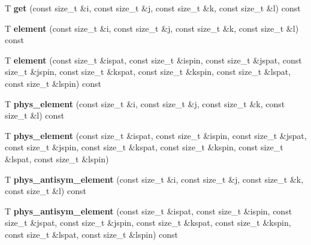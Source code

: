\begin{DoxyCompactItemize}
\item 
T {\bfseries get} (const size\+\_\+t \&i, const size\+\_\+t \&j, const size\+\_\+t \&k, const size\+\_\+t \&l) const \hypertarget{classIntegrals__2e_ae5b99d50f6287691a7277a6739e34870}{}\label{classIntegrals__2e_ae5b99d50f6287691a7277a6739e34870}

\item 
T {\bfseries element} (const size\+\_\+t \&i, const size\+\_\+t \&j, const size\+\_\+t \&k, const size\+\_\+t \&l) const \hypertarget{classIntegrals__2e_a5da037fab4adbcae7f8b0688db61015c}{}\label{classIntegrals__2e_a5da037fab4adbcae7f8b0688db61015c}

\item 
T {\bfseries element} (const size\+\_\+t \&ispat, const size\+\_\+t \&ispin, const size\+\_\+t \&jspat, const size\+\_\+t \&jspin, const size\+\_\+t \&kspat, const size\+\_\+t \&kspin, const size\+\_\+t \&lspat, const size\+\_\+t \&lspin) const \hypertarget{classIntegrals__2e_a252e644b5f183101942933b4510f5bfd}{}\label{classIntegrals__2e_a252e644b5f183101942933b4510f5bfd}

\item 
T {\bfseries phys\+\_\+element} (const size\+\_\+t \&i, const size\+\_\+t \&j, const size\+\_\+t \&k, const size\+\_\+t \&l) const \hypertarget{classIntegrals__2e_a64921e348860e7888cc1a09895c47c92}{}\label{classIntegrals__2e_a64921e348860e7888cc1a09895c47c92}

\item 
T {\bfseries phys\+\_\+element} (const size\+\_\+t \&ispat, const size\+\_\+t \&ispin, const size\+\_\+t \&jspat, const size\+\_\+t \&jspin, const size\+\_\+t \&kspat, const size\+\_\+t \&kspin, const size\+\_\+t \&lspat, const size\+\_\+t \&lspin)\hypertarget{classIntegrals__2e_a682cbd2ff57e84cf32b5b2af9fb7cf45}{}\label{classIntegrals__2e_a682cbd2ff57e84cf32b5b2af9fb7cf45}

\item 
T {\bfseries phys\+\_\+antisym\+\_\+element} (const size\+\_\+t \&i, const size\+\_\+t \&j, const size\+\_\+t \&k, const size\+\_\+t \&l) const \hypertarget{classIntegrals__2e_aa7fea1ef7267ff36439bf1cc7580eb0a}{}\label{classIntegrals__2e_aa7fea1ef7267ff36439bf1cc7580eb0a}

\item 
T {\bfseries phys\+\_\+antisym\+\_\+element} (const size\+\_\+t \&ispat, const size\+\_\+t \&ispin, const size\+\_\+t \&jspat, const size\+\_\+t \&jspin, const size\+\_\+t \&kspat, const size\+\_\+t \&kspin, const size\+\_\+t \&lspat, const size\+\_\+t \&lspin) const \hypertarget{classIntegrals__2e_a79cf3ad586d2626e3d3b3b3b86ce41f9}{}\label{classIntegrals__2e_a79cf3ad586d2626e3d3b3b3b86ce41f9}

\end{DoxyCompactItemize}
